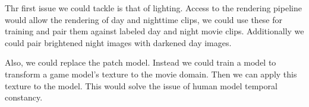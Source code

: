 Thr first issue we could tackle is that of lighting.
Access to the rendering pipeline would allow the rendering of day and nighttime clips, we could use these for training and pair them against labeled day and night movie clips.
Additionally we could pair brightened night images with darkened day images.

Also, we could replace the patch model.
Instead we could train a model to transform a game model's texture to the movie domain.
Then we can apply this texture to the model.
This would solve the issue of human model temporal constancy.